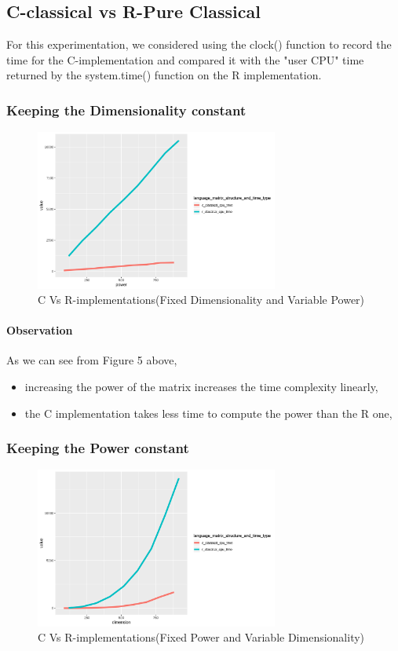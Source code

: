 \documentclass[12pt]{article}
\begin{document}
		\subsection{C-classical vs R-Pure Classical}
			For this experimentation, we considered using the clock() function to record the time for the C-implementation and compared it with the "user CPU" time returned by the system.time() function on the R implementation.
			\subsubsection{Keeping the Dimensionality constant}
			\begin{figure}[h]
				\includegraphics[width= 8cm]{../images/C_R_fixed_dim.png}
				\caption{C Vs R-implementations(Fixed Dimensionality and Variable Power)}
			\end{figure}
			
			
			\paragraph{Observation}
			As we can see from Figure 5 above, 
			\begin{itemize}
				\item increasing the power of the matrix increases the time complexity linearly,
				\item the C implementation takes less time to compute the power than the R one,
			\end{itemize}
	\newpage
		\subsubsection{Keeping the Power constant}
			\begin{figure}[h]
				\includegraphics[width= 8cm]{../images/C_R_fixed_power.png}
				\caption{C Vs R-implementations(Fixed Power and Variable Dimensionality)}
			\end{figure}
			
\end{document}
